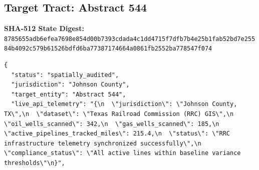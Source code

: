 \documentclass{article}
\begin{document}
\subsection*{Target Tract: Abstract 544}
\textbf{SHA-512 State Digest:}\\
\texttt{8785655adb6efea7698e854d00b7393cdada4c1dd4715f7dfb7b4e25b1fab52bd7e25584b4092c579b61526bdfd6ba77387174664a0861fb2552ba778547f074}
\begin{verbatim}
{
  "status": "spatially_audited",
  "jurisdiction": "Johnson County",
  "target_entity": "Abstract 544",
  "live_api_telemetry": "{\n  \"jurisdiction\": \"Johnson County, TX\",\n  \"dataset\": \"Texas Railroad Commission (RRC) GIS\",\n  \"oil_wells_scanned\": 342,\n  \"gas_wells_scanned\": 185,\n  \"active_pipelines_tracked_miles\": 215.4,\n  \"status\": \"RRC infrastructure telemetry synchronized successfully\",\n  \"compliance_status\": \"All active lines within baseline variance thresholds\"\n}",

\end{verbatim}
\end{document}
